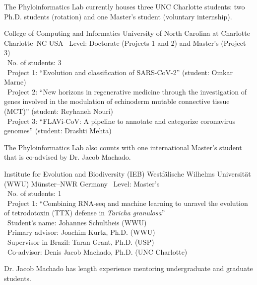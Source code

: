 \documentclass[11pt, letterpaper, sans]{moderncv}
\begin{document}
The Phyloinformatics Lab currently houses three UNC Charlotte students: two Ph.D. students (rotation) and one Master's student (voluntary internship).

\vspace{.5em}

{College of Computing and Informatics}
{University of North Carolina at Charlotte}
{Charlotte--NC}
{USA}
{
	\textbullet~Level: Doctorate (Projects 1 and 2) and Master's (Project 3)\\
	\textbullet~No. of students: 3\\
	\textbullet~Project 1: ``Evolution and classification of SARS-CoV-2'' (student: Omkar Marne)\\
	\textbullet~Project 2: ``New horizons in regenerative medicine through the investigation of genes
involved in the modulation of echinoderm mutable connective tissue (MCT)'' (student: Reyhaneh Nouri)\\
	\textbullet~Project 3: ``FLAVi-CoV: A pipeline to annotate and categorize coronavirus genomes'' (student: Drashti Mehta)\\
}

The Phyloinformatics Lab also counts with one international Master's student that is co-advised by Dr. Jacob Machado.

\vspace{.5em}

{Institute for Evolution and Biodiversity (IEB)}
{Westfälische Wilhelms Universität (WWU)}
{Münster--NWR}
{Germany}
{
	\textbullet~Level: Master's\\
	\textbullet~No. of students: 1\\
	\textbullet~Project 1: ``Combining RNA-seq and machine learning to unravel the evolution of tetrodotoxin (TTX) defense in \textit{Taricha granulosa}''\\
	\textbullet~Student's name: Johannes Schultheis (WWU)\\
	\textbullet~Primary advisor: Joachim Kurtz, Ph.D. (WWU)\\
	\textbullet~Supervisor in Brazil: Taran Grant, Ph.D. (USP)\\
	\textbullet~Co-advisor: Denis Jacob Machado, Ph.D. (UNC Charlotte)\\
}

Dr. Jacob Machado has length experience mentoring undergraduate and graduate students.

\vspace{.5em}
\end{document}

